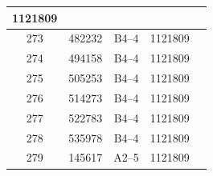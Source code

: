 \documentclass[UTF8,10pt,a4paper,fontset=fandol]{ctexart}
\newcommand{\fieldvalue}[1]{#1}
\begin{document}
\begin{tabular}{|c|c|c|c|p{2.5cm}|}
\fieldvalue{1121809} & \\
\hline
\fieldvalue{273} &
\fieldvalue{482232} &
\fieldvalue{B4--4} &
\fieldvalue{1121809} & \\
\hline
\fieldvalue{274} &
\fieldvalue{494158} &
\fieldvalue{B4--4} &
\fieldvalue{1121809} & \\
\hline
\fieldvalue{275} &
\fieldvalue{505253} &
\fieldvalue{B4--4} &
\fieldvalue{1121809} & \\
\hline
\fieldvalue{276} &
\fieldvalue{514273} &
\fieldvalue{B4--4} &
\fieldvalue{1121809} & \\
\hline
\fieldvalue{277} &
\fieldvalue{522783} &
\fieldvalue{B4--4} &
\fieldvalue{1121809} & \\
\hline
\fieldvalue{278} &
\fieldvalue{535978} &
\fieldvalue{B4--4} &
\fieldvalue{1121809} & \\
\hline
\fieldvalue{279} &
\fieldvalue{145617} &
\fieldvalue{A2--5} &
\fieldvalue{1121809} & \\

\end{tabular}
\end{document}
